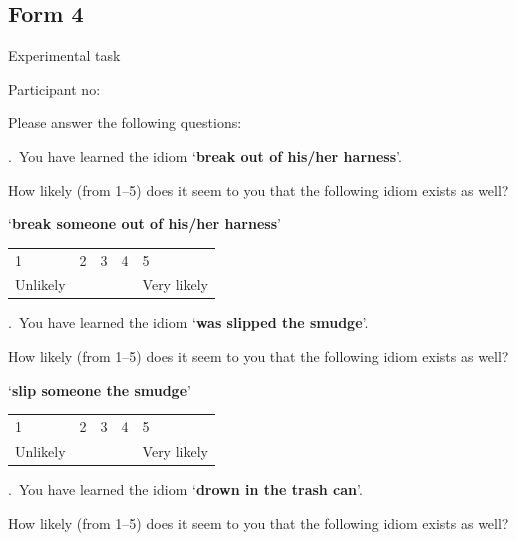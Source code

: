 \documentclass[output=paper]{langsci/langscibook}
\begin{document}
\begin{paperappendix}
{\largerpage[2]
\subsection{Form 4}

Experimental task

\noindent Participant no: \underline{\hphantom{3em}}

\noindent Please answer the following questions:\vspace{.5\baselineskip}

.\ You have learned the idiom \enquote*{\textbf{break out of his/her harness}}.

\noindent How likely (from 1--5) does it seem to you that the following idiom
exists as well?\vspace{.5\baselineskip}

\noindent \enquote*{\textbf{break someone out of his/her harness}}\vspace{.5\baselineskip}

\noindent \begin{tabularx}{\textwidth}{XXXXX}
    1 & 2 & 3 & 4 & 5\\
    Unlikely & & & & Very likely\\
\end{tabularx}\vspace{1\baselineskip}

.\ You have learned the idiom \enquote*{\textbf{was slipped the smudge}}.

\noindent How likely (from 1--5) does it seem to you that the following idiom exists
    as well?\vspace{.5\baselineskip}

\noindent \enquote*{\textbf{slip someone the smudge}}\vspace{.5\baselineskip}

\noindent \begin{tabularx}{\textwidth}{XXXXX}
        1 & 2 & 3 & 4 & 5\\
        Unlikely & & & & Very likely\\
        \end{tabularx}\vspace{1\baselineskip}

\newpage

.\ You have learned the idiom \enquote*{\textbf{drown in the trash can}}.

\noindent How likely (from 1--5) does it seem to you that the following idiom exists
    as well?\vspace{.5\baselineskip}

}
\end{paperappendix}
\end{document}
